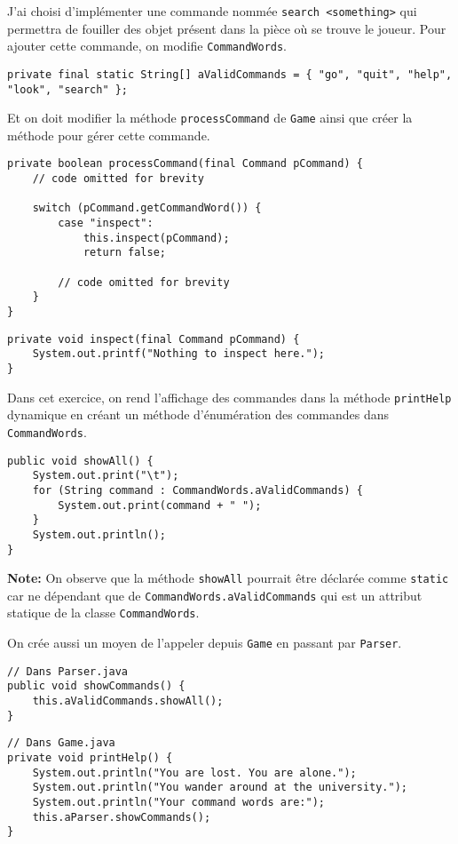 \begin{exercise}[subtitle=Commande search]
 
 J'ai choisi d'implémenter une commande nommée \verb|search <something>| qui permettra de fouiller des objet présent dans la pièce où se trouve le joueur. Pour ajouter cette commande, on modifie \verb|CommandWords|.
 
\begin{verbatim}
private final static String[] aValidCommands = { "go", "quit", "help", "look", "search" };
\end{verbatim}

Et on doit modifier la méthode \verb|processCommand| de \verb|Game| ainsi que créer la méthode pour gérer cette commande.

\begin{verbatim}
private boolean processCommand(final Command pCommand) {
    // code omitted for brevity

    switch (pCommand.getCommandWord()) {
        case "inspect":
            this.inspect(pCommand);
            return false;

        // code omitted for brevity
    }
}
\end{verbatim}

\begin{verbatim}
private void inspect(final Command pCommand) {
    System.out.printf("Nothing to inspect here.");
}
\end{verbatim}
\end{exercise}


\begin{exercise}[subtitle=showAll et showCommands]

Dans cet exercice, on rend l'affichage des commandes dans la méthode \verb|printHelp| dynamique en créant un méthode d'énumération des commandes dans \verb|CommandWords|.


\begin{verbatim}
public void showAll() {
    System.out.print("\t");
    for (String command : CommandWords.aValidCommands) {
        System.out.print(command + " ");
    }
    System.out.println();
}
\end{verbatim}

\textbf{Note:} On observe que la méthode \verb|showAll| pourrait être déclarée comme \verb|static| car ne dépendant que de \verb|CommandWords.aValidCommands| qui est un attribut statique de la classe \verb|CommandWords|.

On crée aussi un moyen de l'appeler depuis \verb|Game| en passant par \verb|Parser|.

\begin{verbatim}
// Dans Parser.java
public void showCommands() {
    this.aValidCommands.showAll();
}
\end{verbatim}

\begin{verbatim}
// Dans Game.java
private void printHelp() {
    System.out.println("You are lost. You are alone.");
    System.out.println("You wander around at the university.");
    System.out.println("Your command words are:");
    this.aParser.showCommands();
}
\end{verbatim}
\end{exercise}

